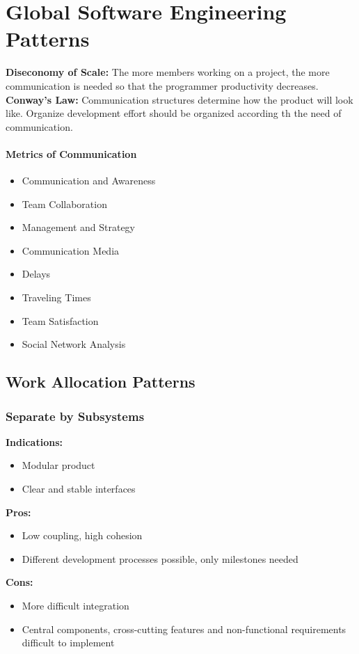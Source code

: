 
\section{Global Software Engineering Patterns}
\textbf{Diseconomy of Scale:}
The more members working on a project, the more communication is needed so that the programmer productivity decreases.\\
\textbf{Conway's Law:}
Communication structures determine how the product will look like.
Organize development effort should be organized according th the need of communication.


\paragraph{Metrics of Communication}
\begin{itemize}[topsep=5pt, itemsep=0pt]
  \item Communication and Awareness
  \item Team Collaboration
  \item Management and Strategy
  \item Communication Media
  \item Delays
  \item Traveling Times
  \item Team Satisfaction
  \item Social Network Analysis
\end{itemize}

\subsection{Work Allocation Patterns}
\subsubsection{Separate by Subsystems}
\textbf{Indications:}
\begin{itemize}[itemsep=0pt]
  \item Modular product
  \item Clear and stable interfaces
\end{itemize}
\textbf{Pros:}
\begin{itemize}[itemsep=0pt]
  \item Low coupling, high cohesion
  \item Different development processes possible, only milestones needed
\end{itemize}
\textbf{Cons:}
\begin{itemize}[itemsep=0pt]
  \item More difficult integration
  \item Central components, cross-cutting features and non-functional requirements difficult to implement
\end{itemize}

